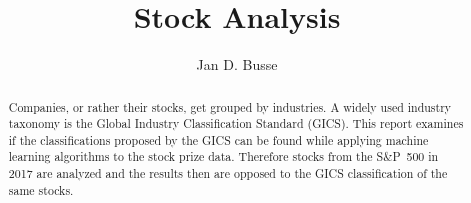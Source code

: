 \documentclass[11pt,paper=a4]{article}
\title{Stock Analysis}
\author{Jan D. Busse}
\begin{document}
	
	\maketitle
%		
%		
%		
%		
%		

	\begin{abstract}
		Companies, or rather their stocks, get grouped by industries. A widely used industry taxonomy is the Global Industry Classification Standard (GICS). This report examines if the classifications proposed by the GICS can be found while applying machine learning algorithms to the stock prize data. Therefore stocks from the S\&P~500 in 2017 are analyzed and the results then are opposed to the GICS classification of the same stocks.
	\end{abstract}
	
	
	
	
	
	
	
	
	
	
\end{document}
